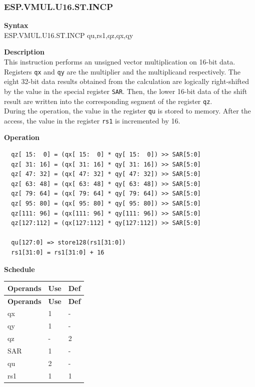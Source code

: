 \newpage
\subsubsection{ESP.VMUL.U16.ST.INCP}\label{instruction:ESPVMULU16STINCP}
\textbf{Syntax}\\
ESP.VMUL.U16.ST.INCP qu,rs1,qz,qx,qy

\textbf{Description}\\
This instruction performs an unsigned vector multiplication on 16-bit data. Registers \lstinline{qx} and \lstinline{qy} are the multiplier and the multiplicand respectively. The eight 32-bit data results obtained from the calculation are logically right-shifted by the value in the special register \lstinline{SAR}. Then, the lower 16-bit data of the shift result are written into the corresponding segment of the register \lstinline{qz}. \\ During the operation, the value in the register \lstinline{qu} is stored to memory. After the access, the value in the register \lstinline{rs1} is incremented by 16.

\textbf{Operation}\\
\begin{lstlisting}
  qz[ 15:  0] = (qx[ 15:  0] * qy[ 15:  0]) >> SAR[5:0]
  qz[ 31: 16] = (qx[ 31: 16] * qy[ 31: 16]) >> SAR[5:0]
  qz[ 47: 32] = (qx[ 47: 32] * qy[ 47: 32]) >> SAR[5:0]
  qz[ 63: 48] = (qx[ 63: 48] * qy[ 63: 48]) >> SAR[5:0]
  qz[ 79: 64] = (qx[ 79: 64] * qy[ 79: 64]) >> SAR[5:0]
  qz[ 95: 80] = (qx[ 95: 80] * qy[ 95: 80]) >> SAR[5:0]
  qz[111: 96] = (qx[111: 96] * qy[111: 96]) >> SAR[5:0]
  qz[127:112] = (qx[127:112] * qy[127:112]) >> SAR[5:0]

  qu[127:0] => store128(rs1[31:0])
  rs1[31:0] = rs1[31:0] + 16
\end{lstlisting}


\textbf{Schedule}\\
\begin{longtable}[c]{|l|l|l|}
    \hline
    \rowcolor{lightgray}
    \textbf{Operands} & \textbf{Use} & \textbf{Def} \\\hline
    \endfirsthead
    \hline
    \rowcolor{lightgray}
     \textbf{Operands} & \textbf{Use} & \textbf{Def} \\\hline
    \endhead
    \hline
    \endfoot

    qx & 1 & - \\\hline
  qy & 1 & - \\\hline
     qz & - & 2 \\\hline
    SAR & 1 & - \\\hline
    qu & 2 & - \\\hline
    rs1 & 1 & 1

\end{longtable}

